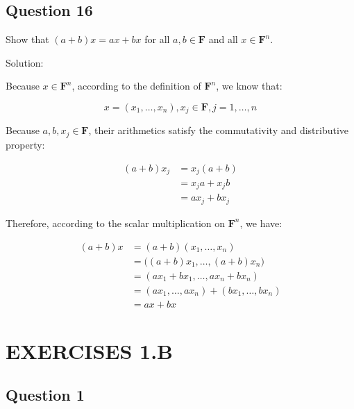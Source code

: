 \documentclass[12pt, letterpaper, oneside]{book}
\begin{document}
\subsection{Question 16}

Show that $(a + b)x = ax + bx$ for all $a, b \in \mathbf{F}$ and all $x \in
  \mathbf{F}^n$.

Solution:

Because $x \in \mathbf{F}^n$, according to the definition of $\mathbf{F}^n$, we
know that:

\[ x = (x_1, \ldots, x_n), x_j \in \mathbf{F}, j = 1, \ldots, n \]

Because $a, b, x_j \in \mathbf{F}$, their arithmetics satisfy the commutativity
and distributive property:

\begin{equation*}
  \begin{split}
    (a + b)x_j
    & = x_j (a + b) \\
    & = x_j a + x_j b \\
    & = a x_j + b x_j
  \end{split}
\end{equation*}

Therefore, according to the scalar multiplication on $\mathbf{F}^n$, we have:

\begin{equation*}
  \begin{split}
    (a + b)x
    & = (a + b)(x_1, \ldots, x_n) \\
    & = \bigl((a + b)x_1, \ldots, (a + b)x_n\bigr) \\
    & = (a x_1 + b x_1, \ldots, a x_n + b x_n) \\
    & = (a x_1, \ldots, a x_n) + (b x_1, \ldots, b x_n) \\
    & = ax + bx
  \end{split}
\end{equation*}

\section{EXERCISES 1.B}

\subsection{Question 1}
\end{document}
